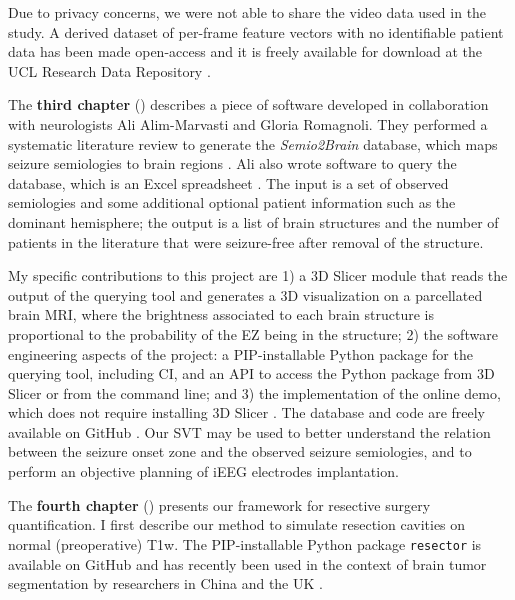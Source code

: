 Due to privacy concerns, we were not able to share the video data used in the study.
A derived dataset of per-frame feature vectors with no identifiable patient data has been made open-access and it is freely available for download at the UCL Research Data Repository \cite{perez-garcia_data_2021}.


The \textbf{third chapter} () describes a piece of software developed in collaboration with neurologists Ali Alim-Marvasti and Gloria Romagnoli.
They performed a systematic literature review to generate the \textit{Semio2Brain} database, which maps seizure semiologies to brain regions \cite{alim-marvasti_probabilistic_2021}.
Ali also wrote software to query the database, which is an Excel spreadsheet \cite{alim-marvasti_mapping_2021}.
The input is a set of observed semiologies and some additional optional patient information such as the dominant hemisphere;
the output is a list of brain structures and the number of patients in the literature that were seizure-free after removal of the structure.

My specific contributions to this project are 1) a 3D Slicer module \cite{fedorov_3d_2012} that reads the output of the querying tool and generates a 3D visualization on a parcellated brain \ac{MRI}, where the brightness associated to each brain structure is proportional to the probability of the \ac{EZ} being in the structure; 2) the software engineering aspects of the project: a \ac{PIP}-installable Python package for the querying tool, including \ac{CI}, and an \ac{API} to access the Python package from 3D Slicer or from the command line; and 3) the implementation of the online demo, which does not require installing 3D Slicer%
.
The database and code are freely available on GitHub%
.
Our \ac{SVT} may be used to better understand the relation between the seizure onset zone and the observed seizure semiologies, and to perform an objective planning of \ac{iEEG} electrodes implantation.


The \textbf{fourth chapter} () presents our framework for resective surgery quantification.
I first describe our method to simulate resection cavities on normal (preoperative) \ac{T1w}.
The \ac{PIP}-installable Python package \texttt{resector} is available on GitHub%
and has recently been used in the context of brain tumor segmentation by researchers in China and the UK \cite{zhang_self-supervised_2021}.

